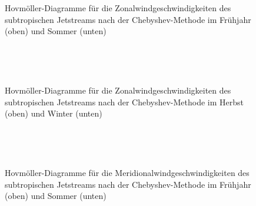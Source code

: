 \begin{figure} %
  \centering
  \begin{minipage}{\textwidth}
    \centering
  \end{minipage} \\ 
    \begin{minipage}{\textwidth}
      \centering
  \end{minipage} \\ 
  \caption[Hovmöllerdiagramme des Zonalwinds des Subtropenjets nach Chebyshev im Frühjahr und Sommer]{Hovmöller-Diagramme für die Zonalwindgeschwindigkeiten des subtropischen Jetstreams nach der Chebyshev-Methode im Frühjahr (oben) und Sommer (unten)}
\end{figure}

\begin{figure}
  \centering
  \begin{minipage}{\textwidth}
    \centering
  \end{minipage} \\ 
    \begin{minipage}{\textwidth}
      \centering
  \end{minipage} \\ 
  \caption[Hovmöllerdiagramme des Zonalwinds des Subtropenjets nach Chebyshev im Herbst und Winter]{Hovmöller-Diagramme für die Zonalwindgeschwindigkeiten des subtropischen Jetstreams nach der Chebyshev-Methode im Herbst (oben) und Winter (unten)}
\end{figure}

\begin{figure} %
  \centering
  \begin{minipage}{\textwidth}
    \centering
  \end{minipage} \\ 
    \begin{minipage}{\textwidth}
      \centering
  \end{minipage} \\ 
  \caption[Hovmöllerdiagramme des Meridionalwinds des Subtropenjets nach Chebyshev im Frühjahr und Sommer]{Hovmöller-Diagramme für die Meridionalwindgeschwindigkeiten des subtropischen Jetstreams nach der Chebyshev-Methode im Frühjahr (oben) und Sommer (unten)}
\end{figure}

